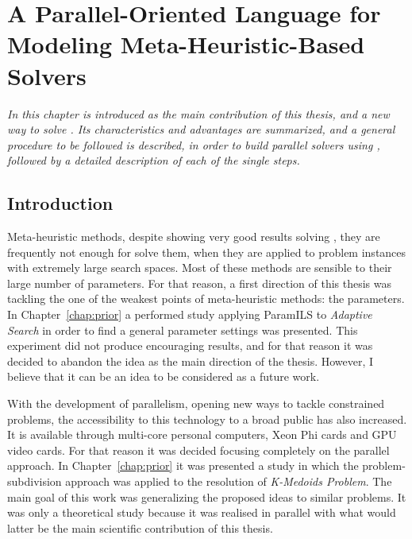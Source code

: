 \chapter{A Parallel-Oriented Language for Modeling Meta-Heuristic-Based Solvers}
\label{chap:posl}
\textit{In this chapter \posl{} is introduced as the main contribution of this thesis, and a new way to solve \csps{}. Its characteristics and advantages are summarized, and a general procedure to be followed is described, in order to build parallel solvers using \posl, followed by a detailed description of each of the single steps.}
\vfill
\minitoc
\newpage

\section{Introduction}

Meta-heuristic methods, despite showing very good results solving \CSPs, they are frequently not enough for solve them, when they are applied to problem instances with extremely large search spaces. Most of these methods are sensible to their large number of parameters. For that reason, a first direction of this thesis was tackling the one of the weakest points of meta-heuristic methods: the parameters. In Chapter~\ref{chap:prior} a performed study applying {\sc ParamILS} to {\it Adaptive Search} in order to find a general parameter settings was presented. This experiment did not produce encouraging results, and for that reason it was decided to abandon the idea as the main direction of the thesis. However, I believe that it can be an idea to be considered as a future work.

With the development of parallelism, opening new ways to tackle constrained problems, the accessibility to this technology to a broad public has also increased. It is available through multi-core personal computers, Xeon Phi cards and GPU video cards. For that reason it was decided focusing completely on the parallel approach. In Chapter~\ref{chap:prior} it was presented a study in which the problem-subdivision approach was applied to the resolution of {\it K-Medoids Problem}. The main goal of this work was generalizing the proposed ideas to similar problems. It was only a theoretical study because it was realised in parallel with what would latter be the main scientific contribution of this thesis.

